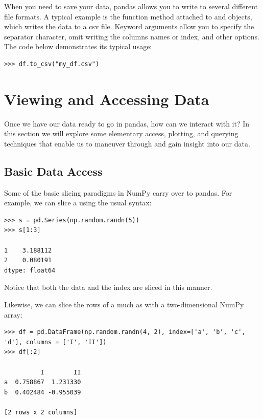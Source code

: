 When you need to save your data, pandas allows you to write to several different file formats.
A typical example is the  function method attached to  and  objects,
which writes the data to a csv file.
Keyword arguments allow you to specify the separator character, omit writing the columns names or index,
and other options. The code below demonstrates its typical usage:
\begin{lstlisting}
>>> df.to_csv("my_df.csv")
\end{lstlisting}

\section*{Viewing and Accessing Data}

Once we have our data ready to go in pandas, how can we interact with it?
In this section we will explore some elementary access, plotting, and querying techniques that enable us to maneuver through
and gain insight into our data.

\subsection*{Basic Data Access}
Some of the basic slicing paradigms in NumPy carry over to pandas. 
For example, we can slice a  using the usual syntax:
\begin{lstlisting}
>>> s = pd.Series(np.random.randn(5))
>>> s[1:3]

1    3.188112
2    0.080191
dtype: float64
\end{lstlisting}
Notice that both the data and the index are sliced in this manner.

Likewise, we can slice the rows of a  much as with a two-dimensional NumPy array:
\begin{lstlisting}
>>> df = pd.DataFrame(np.random.randn(4, 2), index=['a', 'b', 'c', 'd'], columns = ['I', 'II'])
>>> df[:2]

          I        II
a  0.758867  1.231330
b  0.402484 -0.955039

[2 rows x 2 columns]
\end{lstlisting}

